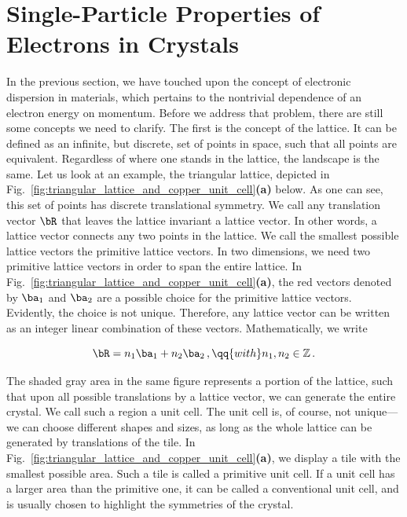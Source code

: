 \section{Single-Particle Properties of Electrons in Crystals}
\label{sec:single_particle_properties}

In the previous section, we have touched upon the concept of electronic dispersion in materials, which pertains to the nontrivial dependence of an electron energy on momentum.
Before we address that problem, there are still some concepts we need to clarify.
The first is the concept of the lattice.
It can be defined as an infinite, but discrete, set of points in space, such that all points are equivalent.
Regardless of where one stands in the lattice, the landscape is the same.
Let us look at an example, the triangular lattice, depicted in Fig.~\ref{fig:triangular_lattice_and_copper_unit_cell}\textbf{(a)} below.
As one can see, this set of points has discrete translational symmetry.
We call any translation vector $\bR$ that leaves the lattice invariant a lattice vector.
In other words, a lattice vector connects any two points in the lattice.
We call the smallest possible lattice vectors the primitive lattice vectors.
In two dimensions, we need two primitive lattice vectors in order to span the entire lattice.
In Fig.~\ref{fig:triangular_lattice_and_copper_unit_cell}\textbf{(a)}, the red vectors denoted by $\ba_1$ and $\ba_2$ are a possible choice for the primitive lattice vectors.
Evidently, the choice is not unique.
Therefore, any lattice vector can be written as an integer linear combination of these vectors.
Mathematically, we write

\begin{equation}
    \label{eq:lattice_vector_definition}
    \bR = n_1 \ba_1 + n_2 \ba_2 \,, \qq{with} n_1,n_2 \in \mathbb{Z}\,.
\end{equation}

The shaded gray area in the same figure represents a portion of the lattice, such that upon all possible translations by a lattice vector, we can generate the entire crystal.
We call such a region a unit cell.
The unit cell is, of course, not unique---we can choose different shapes and sizes, as long as the whole lattice can be generated by translations of the tile.
In Fig.~\ref{fig:triangular_lattice_and_copper_unit_cell}\textbf{(a)}, we display a tile with the smallest possible area.
Such a tile is called a primitive unit cell.
If a unit cell has a larger area than the primitive one, it can be called a conventional unit cell, and is usually chosen to highlight the symmetries of the crystal.

